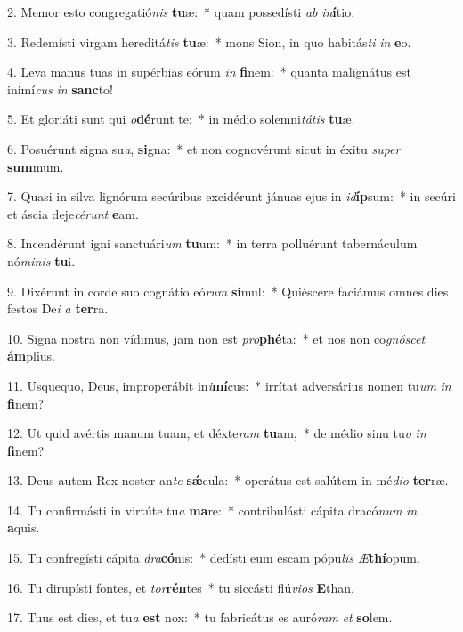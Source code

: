 2. Memor esto congregatió\textit{nis} \textbf{tu}æ:~*  quam possedísti \textit{ab} \textit{in}\textbf{í}tio.\

3. Redemísti virgam hereditá\textit{tis} \textbf{tu}æ:~*  mons Sion, in quo habitás\textit{ti} \textit{in} \textbf{e}o.\

4. Leva manus tuas in supérbias eórum \textit{in} \textbf{fi}nem:~*  quanta malignátus est inimí\textit{cus} \textit{in} \textbf{sanc}to!\

5. Et gloriáti sunt qui \textit{o}\textbf{dé}runt te:~*  in médio solemni\textit{tá}\textit{tis} \textbf{tu}æ.\

6. Posuérunt signa su\textit{a}, \textbf{si}gna:~*  et non cognovérunt sicut in éxitu \textit{su}\textit{per} \textbf{sum}mum.\

7. Quasi in silva lignórum secúribus excidérunt jánuas ejus in \textit{id}\textbf{íp}sum:~*  in secúri et áscia deje\textit{cé}\textit{runt} \textbf{e}am.\

8. Incendérunt igni sanctuári\textit{um} \textbf{tu}um:~*  in terra polluérunt tabernáculum nó\textit{mi}\textit{nis} \textbf{tu}i.\

9. Dixérunt in corde suo cognátio eó\textit{rum} \textbf{si}mul:~*  Quiéscere faciámus omnes dies festos De\textit{i} \textit{a} \textbf{ter}ra.\

10. Signa nostra non vídimus, jam non est \textit{pro}\textbf{phé}ta:~*  et nos non co\textit{gnó}\textit{scet} \textbf{ám}plius.\

11. Usquequo, Deus, improperábit in\textit{i}\textbf{mí}cus:~*  irrítat adversárius nomen tu\textit{um} \textit{in} \textbf{fi}nem?\

12. Ut quid avértis manum tuam, et déxte\textit{ram} \textbf{tu}am,~*  de médio sinu tu\textit{o} \textit{in} \textbf{fi}nem?\

13. Deus autem Rex noster an\textit{te} \textbf{sǽ}cula:~*  operátus est salútem in mé\textit{di}\textit{o} \textbf{ter}ræ.\

14. Tu confirmásti in virtúte tu\textit{a} \textbf{ma}re:~*  contribulásti cápita dracó\textit{num} \textit{in} \textbf{a}quis.\

15. Tu confregísti cápita \textit{dra}\textbf{có}nis:~*  dedísti eum escam pópu\textit{lis} \textit{Æ}\textbf{thí}opum.\

16. Tu dirupísti fontes, et \textit{tor}\textbf{rén}tes~*  tu siccásti flú\textit{vi}\textit{os} \textbf{E}than.\

17. Tuus est dies, et tu\textit{a} \textbf{est} nox:~*  tu fabricátus es auró\textit{ram} \textit{et} \textbf{so}lem.\


